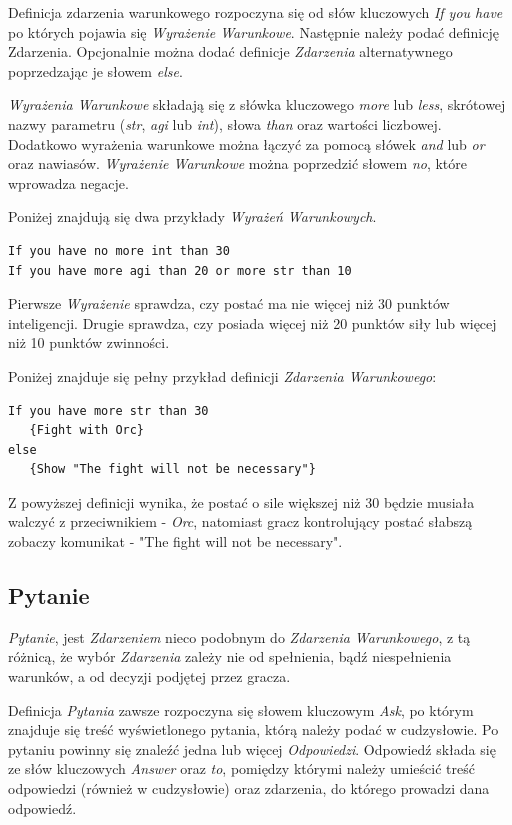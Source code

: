 \documentclass[openright]{xmgr}
\begin{document}
Definicja zdarzenia warunkowego rozpoczyna się od słów kluczowych \textit{If you have} po których pojawia się \textit{Wyrażenie Warunkowe}. Następnie należy podać definicję Zdarzenia. Opcjonalnie można dodać definicje \textit{Zdarzenia} alternatywnego poprzedzając je słowem \textit{else}.

\textit{Wyrażenia Warunkowe} składają się z słówka kluczowego \textit{more} lub \textit{less}, skrótowej nazwy parametru (\textit{str}, \textit{agi} lub \textit{int}), słowa \textit{than} oraz wartości liczbowej. Dodatkowo wyrażenia warunkowe można łączyć za pomocą słówek \textit{and} lub \textit{or} oraz nawiasów. \textit{Wyrażenie Warunkowe} można poprzedzić słowem \textit{no}, które wprowadza negacje.

Poniżej znajdują się dwa przykłady \textit{Wyrażeń Warunkowych}.
\begin{verbatim}
If you have no more int than 30
If you have more agi than 20 or more str than 10
\end{verbatim}

Pierwsze \textit{Wyrażenie} sprawdza, czy postać ma nie więcej niż 30 punktów inteligencji. Drugie sprawdza, czy posiada więcej niż 20 punktów siły lub więcej niż 10 punktów zwinności.

Poniżej znajduje się pełny przykład definicji \textit{Zdarzenia Warunkowego}: 
\begin{verbatim}
If you have more str than 30 
   {Fight with Orc}
else 
   {Show "The fight will not be necessary"}
\end{verbatim}

Z powyższej definicji wynika, że postać o sile większej niż 30 będzie musiała walczyć z przeciwnikiem - \textit{Orc}, natomiast gracz kontrolujący postać słabszą zobaczy komunikat - "The fight will not be necessary".

\subsection{Pytanie}
\textit{Pytanie}, jest \textit{Zdarzeniem} nieco podobnym do \textit{Zdarzenia Warunkowego}, z tą różnicą, że wybór \textit{Zdarzenia} zależy nie od spełnienia, bądź niespełnienia warunków, a od decyzji podjętej przez gracza.

Definicja \textit{Pytania} zawsze rozpoczyna się słowem kluczowym \textit{Ask}, po którym znajduje się treść wyświetlonego pytania, którą należy podać w cudzysłowie. Po pytaniu powinny się znaleźć jedna lub więcej \textit{Odpowiedzi}. Odpowiedź składa się ze słów kluczowych \textit{Answer} oraz \textit{to}, pomiędzy którymi należy umieścić treść odpowiedzi (również w cudzysłowie) oraz zdarzenia, do którego prowadzi dana odpowiedź. 
\end{document}
